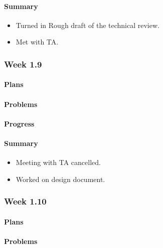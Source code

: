 \documentclass[onecolumn, draftclsnofoot,10pt, compsoc]{article}
\begin{document}
		    \paragraph{Summary}
		    \begin{itemize}
		    \item Turned in Rough draft of the technical review.
            \item Met with TA.
            \end{itemize}


		\subsubsection{Week 1.9}

			\paragraph{Plans} \hfill \break

		    \paragraph{Problems} \hfill \break

		    \paragraph{Progress} \hfill \break

		    \paragraph{Summary} \hfill \break
		    \begin{itemize}
                \item Meeting with TA cancelled.
                \item Worked on design document. \\
		     \end{itemize}
		\subsubsection{Week 1.10}

		    \paragraph{Plans} \hfill \break

		    \paragraph{Problems} \hfill \break
\end{document}
